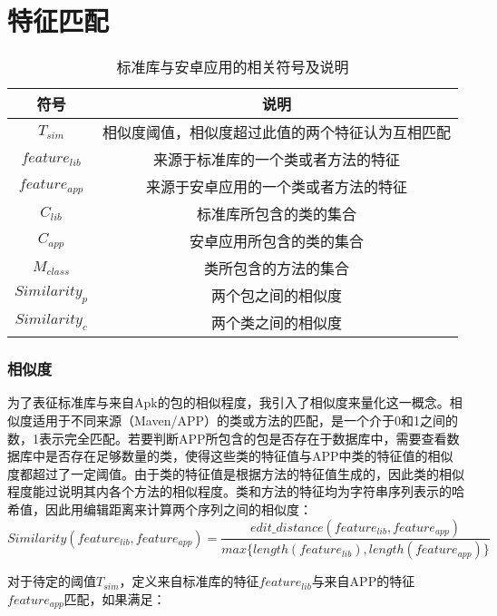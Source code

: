 \section{特征匹配}


\begin{table}[!hpt]
  \caption{标准库与安卓应用的相关符号及说明}
  \label{tab:symbol}
  \centering
  \begin{tabular}{cc} \toprule
    符号 &  说明 \\ \midrule
    $T_{sim}$ & 相似度阈值，相似度超过此值的两个特征认为互相匹配 \\
	$feature_{lib}$ & 来源于标准库的一个类或者方法的特征 \\ 
	$feature_{app}$ & 来源于安卓应用的一个类或者方法的特征 \\
	$C_{lib}$ & 标准库所包含的类的集合 \\
	$C_{app}$ & 安卓应用所包含的类的集合 \\
	$M_{class}$ & 类所包含的方法的集合\\
	$Similarity_p$ & 两个包之间的相似度\\
	$Similarity_c$ & 两个类之间的相似度\\
	 \bottomrule

  \end{tabular}
\end{table}


\subsubsection{相似度}

为了表征标准库与来自Apk的包的相似程度，我引入了相似度来量化这一概念。相似度适用于不同来源（Maven/APP）的类或方法的匹配，是一个介于0和1之间的数，1表示完全匹配。若要判断APP所包含的包是否存在于数据库中，需要查看数据库中是否存在足够数量的类，使得这些类的特征值与APP中类的特征值的相似度都超过了一定阈值。由于类的特征值是根据方法的特征值生成的，因此类的相似程度能过说明其内各个方法的相似程度。类和方法的特征均为字符串序列表示的哈希值，因此用编辑距离来计算两个序列之间的相似度：
\begin{equation}
Similarity(feature_{lib},feature_{app})=\frac{edit\_distance(feature_{lib},feature_{app})}{max\{length(feature_{lib}),length(feature_{app})\}}
\end{equation}

对于待定的阈值$T_{sim}$，定义来自标准库的特征$feature_{lib}$与来自APP的特征$feature_{app}$匹配，如果满足：

